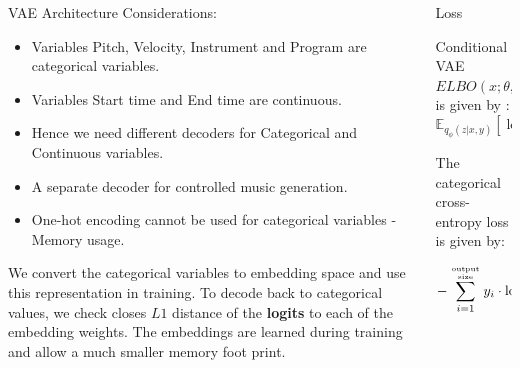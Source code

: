 \documentclass[final]{beamer}
\newlength{\onecolwid}
\newlength{\twocolwid}
\begin{document}
\begin{frame}[t]
\begin{columns}[t]
\begin{column}{\twocolwid}
\begin{columns}[t,totalwidth=\twocolwid]
\begin{column}{\onecolwid}
\begin{block}{VAE Architecture}
Considerations:

\begin{itemize}
\item Variables Pitch, Velocity, Instrument and Program are categorical variables.
\item Variables Start time and End time are continuous.
\item Hence we need different decoders for Categorical and Continuous variables.
\item A separate decoder for controlled music generation.
\item One-hot encoding cannot be used for categorical variables - Memory usage.
\end{itemize}

We convert the categorical variables to embedding space and use this representation in training. To decode back to categorical values, we check closes $L1$ distance of the \textbf{logits} to each of the embedding weights. The embeddings are learned during training and allow a much smaller memory foot print.
 


\end{block}

\end{column} %

\begin{column}{\onecolwid}\vspace{-.6in} %


\begin{block}{Loss}

Conditional VAE $ELBO(x;\theta, \phi, y)$ is given by :
\begin{equation}
\mathbb{E}_{q_{\phi}(z|x,y)} [ \log(p_{\theta}(x|z, y))]  - \mathbb{D}(q_{\phi}(z|x, y) || p(z))
\end{equation}

The categorical cross-entropy loss is given by:

\begin{equation}
 -\sum_{i=1}^{\mathrm{output \atop size}} y_i \cdot \mathrm{log}\; {\hat{y}}_i
\end{equation}


\end{block}
\end{column}
\end{columns}
\end{column}
\end{columns}
\end{frame}
\end{document}

